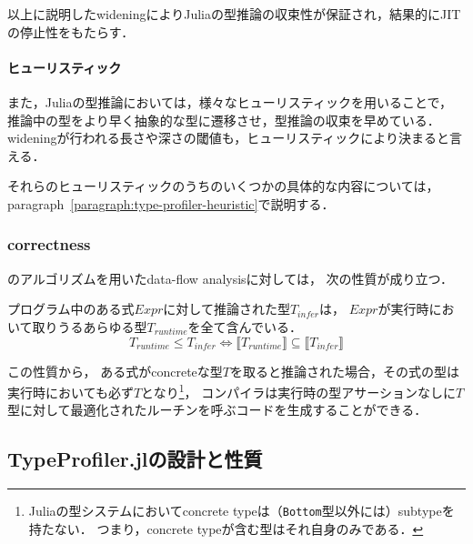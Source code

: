以上に説明したwideningによりJuliaの型推論の収束性が保証され，結果的にJITの停止性をもたらす．

\paragraph{ヒューリスティック} \label{paragraph:inference-heuristic}

また，Juliaの型推論においては，様々なヒューリスティックを用いることで，
推論中の型をより早く抽象的な型に遷移させ，型推論の収束を早めている．
wideningが行われる長さや深さの閾値も，ヒューリスティックにより決まると言える．

それらのヒューリスティックのうちのいくつかの具体的な内容については，
paragraph~\ref{paragraph:type-profiler-heuristic}で説明する．

\subsubsection{correctness} \label{subsubsection:inference-correctness}

\cite{graph-free-data-flow-analysis}のアルゴリズムを用いたdata-flow analysisに対しては，
次の性質が成り立つ\cite{jeff-master}．


\begin{theorem*}[correctness]
  \label{theorem:inference-correctness}
  プログラム中のある式\(Expr\)に対して推論された型\(T_{infer}\)は，
  \(Expr\)が実行時において取りうるあらゆる型\(T_{runtime}\)を全て含んでいる．
  \[
    T_{runtime} \leq T_{infer} \Leftrightarrow \llbracket T_{runtime} \rrbracket \subseteq \llbracket T_{infer} \rrbracket
  \]
\end{theorem*}

この性質から，
ある式がconcreteな型\(T\)を取ると推論された場合，その式の型は実行時においても必ず\(T\)となり\footnote{
  Juliaの型システムにおいてconcrete typeは（\texttt{Bottom}型以外には）subtypeを持たない．
  つまり，concrete typeが含む型はそれ自身のみである．
}，
コンパイラは実行時の型アサーションなしに\(T\)型に対して最適化されたルーチンを呼ぶコードを生成することができる．


\subsection{TypeProfiler.jlの設計と性質} \label{subsection:type-profiler-design-and-property}

